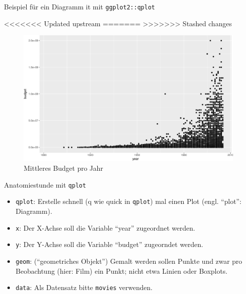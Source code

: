 \begin{frame}[fragile]{Beispiel für ein Diagramm it mit
\texttt{ggplot2::qplot}}

\begin{Shaded}
\begin{Highlighting}[]
<<<<<<< Updated upstream
\NormalTok{(} \NormalTok{, }
=======
\NormalTok{(}   \NormalTok{, } 
>>>>>>> Stashed changes
\end{Highlighting}
\end{Shaded}

\begin{figure}

{\centering \includegraphics[width=0.5\linewidth]{PraDa_Folien_nm_2_files/figure-beamer/fig-movies-1} 

}

\caption{Mittleres Budget pro Jahr}\label{fig:fig-movies}
\end{figure}

\end{frame}

\begin{frame}[fragile]{Anatomiestunde mit \texttt{qplot}}

\begin{itemize}
\tightlist
\item
  \texttt{qplot}: Erstelle schnell (q wie quick in \texttt{qplot}) mal
  einen Plot (engl. ``plot'': Diagramm).\\
\item
  \texttt{x}: Der X-Achse soll die Variable ``year'' zugeordnet
  werden.\\
\item
  \texttt{y}: Der Y-Achse soll die Variable ``budget'' zugeorndet
  werden.\\
\item
  \texttt{geom}: (``geometriches Objekt'') Gemalt werden sollen Punkte
  und zwar pro Beobachtung (hier: Film) ein Punkt; nicht etwa Linien
  oder Boxplots.
\item
  \texttt{data}: Als Datensatz bitte \texttt{movies} verwenden.
\end{itemize}

\end{frame}

